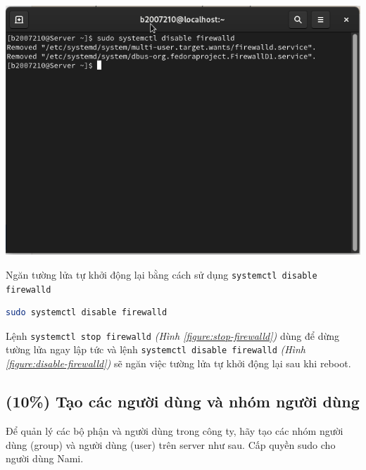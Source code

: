 \documentclass[a4paper, 11pt]{article}
\begin{document}
\begin{itemize}
          \begin{minipage}
              {\linewidth}
              \captionsetup{type=figure}
              \centering
              \includegraphics[width=\linewidth]{images/disable-firewalld.png}
              \caption{Ngăn tường lửa tự khởi động lại bằng cách sử dụng \texttt{systemctl disable firewalld}}
              \label{figure:disable-firewalld}
          \end{minipage}

          \begin{lstlisting}[language=bash, caption=Ngăn tường lửa tự khởi động lại]
sudo systemctl disable firewalld
\end{lstlisting}

          Lệnh \texttt{systemctl stop firewalld} \textit{(Hình \ref{figure:stop-firewalld})} dùng để dừng tường lửa ngay lập tức và lệnh \texttt{systemctl disable firewalld} \textit{(Hình \ref{figure:disable-firewalld})} sẽ ngăn việc tường lửa tự khởi động lại sau khi reboot.
\end{itemize}

\subsection{(10\%) Tạo các người dùng và nhóm người dùng}

Để quản lý các bộ phận và người dùng trong công ty, hãy tạo các nhóm người dùng (group) và người dùng (user) trên server như sau. Cấp quyền sudo cho người dùng Nami.
\end{document}
